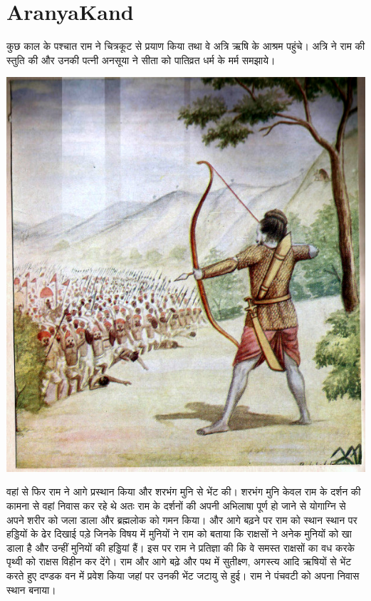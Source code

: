 \documentclass[makeidx, 10pt, oneside, onecolumn, openright, final, svgnames, dvipsnames, extrafontsizes]{memoir}
\begin{document}
\chapter[अरण्यकाण्ड]{AranyaKand}
\thispagestyle{empty}



\hspace{5mm}कुछ काल के पश्चात राम ने चित्रकूट से प्रयाण किया तथा वे अत्रि ऋषि के आश्रम पहुंचे। अत्रि ने राम की स्तुति की और उनकी पत्नी अनसूया ने सीता को पातिव्रत धर्म के मर्म समझाये। 

 \begin{center}
\includegraphics[scale=0.27]{Rama_Fights_the_Demons.jpg}
\end{center}

वहां से फिर राम ने आगे प्रस्थान किया और शरभंग मुनि से भेंट की। शरभंग मुनि केवल राम के दर्शन की कामना से वहां निवास कर रहे थे अतः राम के दर्शनों की अपनी अभिलाषा पूर्ण हो जाने से योगाग्नि से अपने शरीर को जला डाला और ब्रह्मलोक को गमन किया। और आगे बढ़ने पर राम को स्थान स्थान पर हड्डियों के ढेर दिखाई पड़े जिनके विषय में मुनियों ने राम को बताया कि राक्षसों ने अनेक मुनियों को खा डाला है और उन्हीं मुनियों की हड्डियां हैं। इस पर राम ने प्रतिज्ञा की कि वे समस्त राक्षसों का वध करके पृथ्वी को राक्षस विहीन कर देंगे। राम और आगे बढ़े और पथ में सुतीक्ष्ण, अगस्त्य आदि ऋषियों से भेंट करते हुए दण्डक वन में प्रवेश किया जहां पर उनकी भेंट जटायु से हुई। राम ने पंचवटी को अपना निवास स्थान बनाया।
\end{document}
